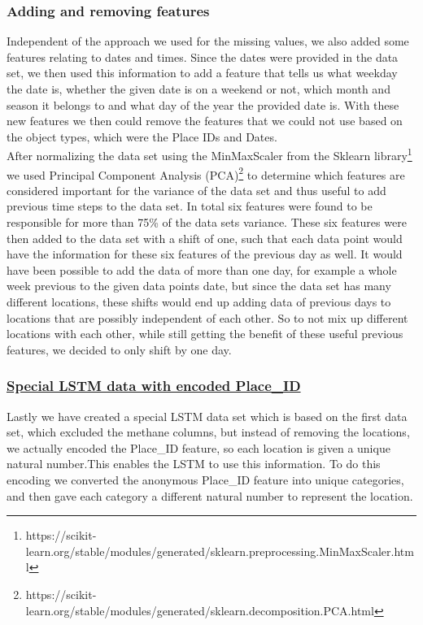 \documentclass{article}
\begin{document}
\subsubsection{Adding and removing features}
Independent of the approach we used for the missing values, we also added some features relating to dates and times. Since the dates were provided in the data set, we then used this information to add a feature that tells us what weekday the date is, whether the given date is on a weekend or not, which month and season it belongs to and what day of the year the provided date is. With these new features we then could remove the features that we could not use based on the object types, which were the Place IDs and Dates. \\ 
After normalizing the data set using the MinMaxScaler from the Sklearn library\footnote{https://scikit-learn.org/stable/modules/generated/sklearn.preprocessing.MinMaxScaler.html} 
we used Principal Component Analysis (PCA)\footnote{https://scikit-learn.org/stable/modules/generated/sklearn.decomposition.PCA.html} 
to determine which features are considered important for the variance of the data set and thus useful to add previous time steps to the data set. In total six features were found to be responsible for more than 75\% of the data sets variance. These six features were then added to the data set with a shift of one, such that each data point would have the information for these six features of the previous day as well. It would have been possible to add the data of more than one day, for example a whole week previous to the given data points date, but since the data set has many different locations, these shifts would end up adding data of previous days to locations that are possibly independent of each other. So to not mix up different locations with each other, while still getting the benefit of these useful previous features, we decided to only shift by one day.

\subsubsection{\href{https://github.com/tjayada/iANNwTF_Project/blob/main/data\%20preparation/06_finished_and_clean_LSTM(1).ipynb}{Special LSTM data with encoded Place\_ID}}
Lastly we have created a special LSTM data set which is based on the first data set, which excluded the methane columns, but instead of removing the locations, we actually encoded the 
{\selectfont Place\_ID} feature, so each location is given a unique natural number.This enables the LSTM to use this information. To do this encoding we converted the anonymous {\selectfont Place\_ID} feature into unique categories, and then gave each category a different natural number to represent the location.
\end{document}
